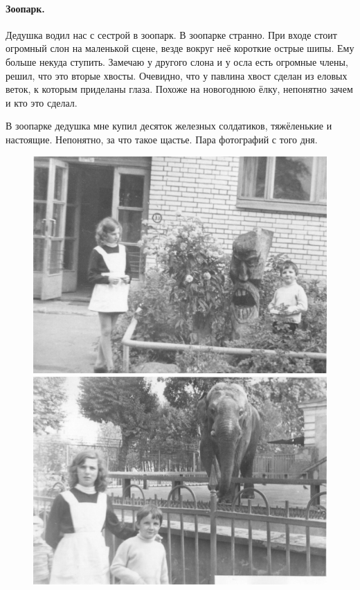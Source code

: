 \documentclass{book}
\begin{document}
\paragraph{Зоопарк.}
Дедушка водил нас с сестрой в зоопарк.
В зоопарке странно.
При входе стоит огромный слон на маленькой сцене, везде вокруг неё короткие острые шипы. 
Ему больше некуда ступить.
Замечаю у другого слона и у осла есть огромные члены,
решил, что это вторые хвосты.
Очевидно, что у павлина хвост сделан из еловых веток, к которым приделаны глаза.
Похоже на новогоднюю ёлку, 
непонятно зачем и кто это сделал.

В зоопарке дедушка мне купил десяток железных солдатиков, тяжёленькие и настоящие. 
Непонятно, за что такое щастье.
Пара фотографий с того дня.

\begin{figure}[!ht]
\begin{minipage}{.49\textwidth}
\centering
\includegraphics[scale=.5]{pics/lena-tosha-dveri_parkhomenko}
\end{minipage}
\hfill
\begin{minipage}{.49\textwidth}
\centering
\includegraphics[scale=.5]{pics/lena-tosha-zoopark}
\end{minipage}
\end{figure}
\end{document}

